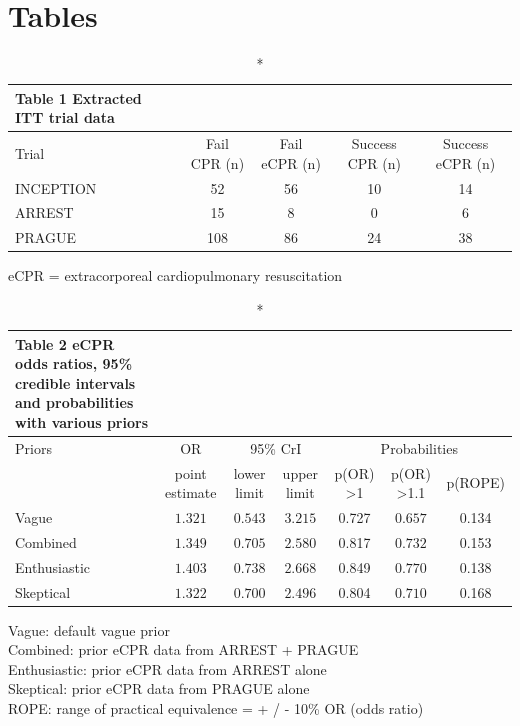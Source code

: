 \documentclass[
  super,
  preprint,
  3p]{elsarticle}
\begin{document}
\newpage

\hypertarget{tables}{%
\section{Tables}\label{tables}}

\setlength{\LTpost}{0mm}
\begin{longtable}{lcccc}
\caption*{
{\large Table 1 Extracted ITT trial data}
} \\ 
\toprule
Trial & Fail CPR (n) & Fail eCPR (n) & Success CPR (n) & Success eCPR (n) \\ 
\midrule
INCEPTION & 52 & 56 & 10 & 14 \\ 
ARREST & 15 & 8 & 0 & 6 \\ 
PRAGUE & 108 & 86 & 24 & 38 \\ 
\bottomrule
\end{longtable}
\begin{minipage}{\linewidth}
eCPR = extracorporeal cardiopulmonary resuscitation\\
\end{minipage}

\setlength{\LTpost}{0mm}
\begin{longtable}{lcccccc}
\caption*{
{\large Table 2 eCPR odds ratios, 95\% credible intervals and probabilities with various priors}
} \\ 
\toprule
Priors & OR & \multicolumn{2}{c}{95\% CrI} & \multicolumn{3}{c}{Probabilities} \\ 
\cmidrule(lr){1-1} \cmidrule(lr){2-2} \cmidrule(lr){3-4} \cmidrule(lr){5-7}
 & point estimate & lower limit & upper limit & p(OR) >1  & p(OR) >1.1  &  p(ROPE) \\ 
\midrule
Vague & $1.321$ & $0.543$ & $3.215$ & 0.727 & $0.657$ & 0.134 \\ 
Combined & $1.349$ & $0.705$ & $2.580$ & 0.817 & $0.732$ & 0.153 \\ 
Enthusiastic & $1.403$ & $0.738$ & $2.668$ & 0.849 & $0.770$ & 0.138 \\ 
Skeptical & $1.322$ & $0.700$ & $2.496$ & 0.804 & $0.710$ & 0.168 \\ 
\bottomrule
\end{longtable}
\begin{minipage}{\linewidth}
Vague: default vague prior\\
Combined: prior eCPR data from ARREST + PRAGUE\\
Enthusiastic: prior eCPR data from ARREST alone\\
Skeptical: prior eCPR data from PRAGUE alone\\
ROPE: range of practical equivalence = + / - 10\% OR (odds ratio)\\
\end{minipage}
\end{document}
